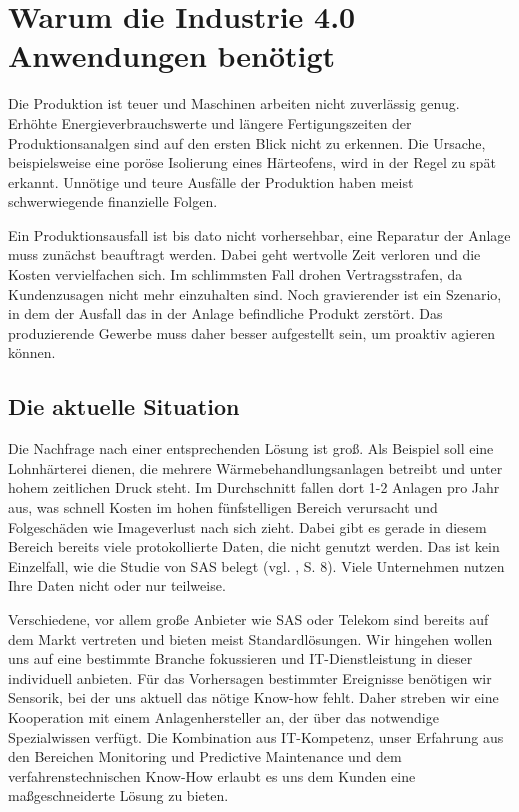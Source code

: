 \newpage
\section{Warum die Industrie 4.0 Anwendungen benötigt}

Die Produktion ist teuer und Maschinen arbeiten nicht zuverlässig genug. Erhöhte Energieverbrauchswerte und längere Fertigungszeiten der Produktionsanalgen sind auf den ersten Blick nicht zu erkennen. Die Ursache, beispielsweise eine poröse Isolierung eines Härteofens, wird in der Regel zu spät erkannt. Unnötige und teure Ausfälle der Produktion haben meist schwerwiegende finanzielle Folgen.

Ein Produktionsausfall ist bis dato nicht vorhersehbar, eine Reparatur der Anlage muss zunächst beauftragt werden. Dabei geht wertvolle Zeit verloren und die Kosten vervielfachen sich. Im schlimmsten Fall drohen Vertragsstrafen, da Kundenzusagen nicht mehr einzuhalten sind. Noch gravierender ist ein Szenario, in dem der Ausfall das in der Anlage befindliche Produkt zerstört. Das produzierende Gewerbe muss daher besser aufgestellt sein, um proaktiv agieren können. 


\subsection{Die aktuelle Situation}
Die Nachfrage nach einer entsprechenden Lösung ist groß. Als Beispiel soll eine Lohnhärterei dienen, die mehrere Wärmebehandlungsanlagen betreibt und unter hohem zeitlichen Druck steht. Im Durchschnitt fallen dort 1-2 Anlagen pro Jahr aus, was schnell Kosten im hohen fünfstelligen Bereich verursacht und Folgeschäden wie Imageverlust nach sich zieht. Dabei gibt es gerade in diesem Bereich bereits viele protokollierte Daten, die nicht genutzt werden. Das ist kein Einzelfall, wie die Studie von SAS belegt (vgl. \cite{SasForsa}, S. 8). Viele Unternehmen nutzen Ihre Daten nicht oder nur teilweise.

Verschiedene, vor allem große Anbieter wie SAS oder Telekom sind bereits auf dem Markt vertreten und bieten meist Standardlösungen. Wir hingehen wollen uns auf eine bestimmte Branche fokussieren und IT-Dienstleistung in dieser individuell anbieten. Für das Vorhersagen bestimmter Ereignisse benötigen wir Sensorik, bei der uns aktuell das nötige Know-how fehlt. Daher streben wir eine Kooperation mit einem Anlagenhersteller an, der über das notwendige Spezialwissen verfügt. Die Kombination aus IT-Kompetenz, unser Erfahrung aus den Bereichen Monitoring und Predictive Maintenance und dem verfahrenstechnischen Know-How erlaubt es uns dem Kunden eine maßgeschneiderte Lösung zu bieten.

